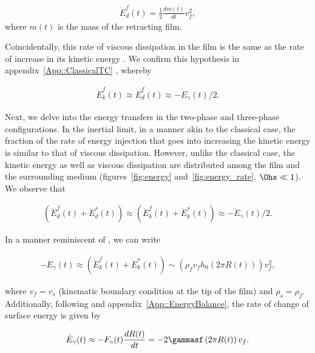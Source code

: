 \begin{align}
	\dot{E}_d^f(t) = \frac{1}{2}\frac{dm(t)}{dt}v_f^2 , 
	\label{Eqn::Classical Dissipation}
\end{align}
where $m(t)$ is the mass of the retracting film. 

Coincidentally, this rate of viscous dissipation in the film is the same as the rate of increase in its kinetic energy \citep[constant rim velocity,][]{culick-1960-japplphys, villermaux2020fragmentation}. We confirm this hypothesis in appendix~\ref{App::ClassicalTC} \citep[see figures~\ref{fig:ClassicalTC}c, d, and][]{sunderhauf-2002-pof}, whereby

\begin{align}
	\dot{E}_k^f(t) \approx \dot{E}_d^f(t) \approx - \dot{E}_\gamma(t)/2.
\end{align}

Next, we delve into the energy transfers in the two-phase and three-phase configurations. In the inertial limit, in a manner akin to the classical case, the fraction of the rate of energy injection that goes into increasing the kinetic energy is similar to that of viscous dissipation. However, unlike the classical case, the kinetic energy as well as viscous dissipation are distributed among the film and the surrounding medium (figures~\ref{fig:energy} and~\ref{fig:energy_rate}, $\Ohs \ll 1$). We observe that

\begin{align}
	\left(\dot{E}_d^f(t) + \dot{E}_d^s(t)\right) \approx \left(\dot{E}_k^f(t) + \dot{E}_k^s(t)\right) \approx -\dot{E}_\gamma(t)/2.
\end{align}

\noindent In a manner reminiscent of \citet{dupre1867theorie, dupre1869theorie}, we can write

\begin{align}
	-\dot{E}_\gamma(t) \approx \left(\dot{E}_k^f(t) + \dot{E}_k^s(t)\right) \sim \left(\rho_f v_fh_0\left(2\pi R(t)\right)\right)v_f^2,
	\label{Eqn::ReminiscentDupre}
\end{align}

\noindent where $v_f = v_s$ (kinematic boundary condition at the tip of the film) and $\rho_s = \rho_f$. Additionally, following \citet{bohr2021surface} and appendix~\ref{App::EnergyBalance}, the rate of change of surface energy is given by

\begin{align}
	\dot{E}_\gamma(t) \approx -F_{\gamma}(t) \frac{dR(t)}{dt} = -2\gammasf\left(2\pi R(t)\right)v_f.
	\label{Eqn::Surface Energy rate}
\end{align}

